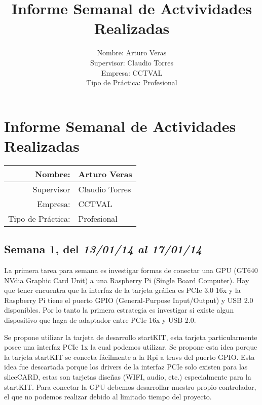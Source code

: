 \documentclass[11pt,oneside,titlepage]{article}
\begin{document}
\title{Informe Semanal de Actvividades Realizadas}
\author{Nombre: Arturo Veras\\ 
	Supervisor: Claudio Torres\\
	Empresa: CCTVAL \\
Tipo de Práctica: Profesional}
%
\section*{Informe Semanal de Actividades Realizadas}
\begin{center}

\begin{tabular}{|r|l|}
\hline 
Nombre:  & Arturo Veras\\ 
\hline 
Supervisor & Claudio Torres \\ 
\hline 
Empresa: & CCTVAL \\ 
\hline 
Tipo de Práctica: & Profesional \\ 
\hline 
\end{tabular} 

\end{center}
\subsection*{Semana 1, del \textit{13/01/14 al 17/01/14}}
\begin{comment}
Tercera persona Él, Ella, Ello (del latín ille, illa, illud)
Se redacta en lenguaje formal y atemporal (no usar formas verbales en pasado simple)
Compró el periódico y se tomó un café.
\end{comment}

La primera tarea para semana es investigar formas de conectar una GPU (GT640 NVdia Graphic Card Unit) a una Raspberry Pi (Single Board Computer). Hay que tener encuentra que la interfaz de la tarjeta gr\'afica es PCIe 3.0 16x y la Raspberry Pi tiene el puerto GPIO (General-Purpose Input/Output) y USB 2.0 disponibles. Por lo tanto la primera estrategia es investigar si existe alg\´un dispositivo que haga de adaptador entre PCIe 16x y USB 2.0. 

Se propone utilizar la tarjeta de desarrollo startKIT, esta tarjeta
particularmente posee una interfaz PCIe  1x la cual podemos utilizar.  Se
propone esta idea porque la tarjeta startKIT se conecta fácilmente a la Rpi a
travs del puerto GPIO.  Esta idea fue descartada porque los drivers de la
interfaz PCIe solo existen para las sliceCARD, estas son tarjetas diseñas
(WIFI, audio, etc.) especialmente para la startKIT. Para conectar la GPU
debemos desarrollar nuestro propio controlador, el que no podemos realizar
debido al limitado tiempo del proyecto.  
\end{document}
